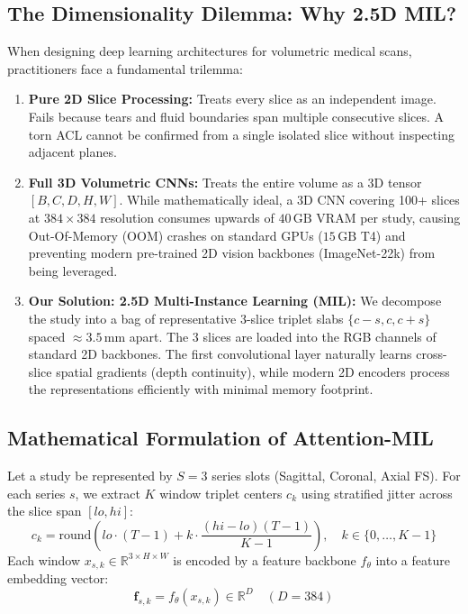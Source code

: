 \documentclass[11pt,a4paper]{article}
\begin{document}
\subsection{The Dimensionality Dilemma: Why 2.5D MIL?}
When designing deep learning architectures for volumetric medical scans, practitioners face a fundamental trilemma:
\begin{enumerate}
    \item \textbf{Pure 2D Slice Processing:} Treats every slice as an independent image. Fails because tears and fluid boundaries span multiple consecutive slices. A torn ACL cannot be confirmed from a single isolated slice without inspecting adjacent planes.
    \item \textbf{Full 3D Volumetric CNNs:} Treats the entire volume as a 3D tensor $[B, C, D, H, W]$. While mathematically ideal, a 3D CNN covering 100+ slices at $384\times 384$ resolution consumes upwards of $40\,\text{GB}$ VRAM per study, causing Out-Of-Memory (OOM) crashes on standard GPUs ($15\,\text{GB}$ T4) and preventing modern pre-trained 2D vision backbones (ImageNet-22k) from being leveraged.
    \item \textbf{Our Solution: 2.5D Multi-Instance Learning (MIL):} We decompose the study into a bag of representative 3-slice triplet slabs $\{c-s, c, c+s\}$ spaced $\approx 3.5\,\text{mm}$ apart. The 3 slices are loaded into the RGB channels of standard 2D backbones. The first convolutional layer naturally learns cross-slice spatial gradients (depth continuity), while modern 2D encoders process the representations efficiently with minimal memory footprint.
\end{enumerate}

\subsection{Mathematical Formulation of Attention-MIL}
Let a study be represented by $S = 3$ series slots (Sagittal, Coronal, Axial FS). For each series $s$, we extract $K$ window triplet centers $c_k$ using stratified jitter across the slice span $[lo, hi]$:
\begin{equation}
    c_k = \text{round}\left(lo \cdot (T-1) + k \cdot \frac{(hi - lo)(T-1)}{K-1}\right), \quad k \in \{0, \dots, K-1\}
\end{equation}
Each window $x_{s,k} \in \mathbb{R}^{3 \times H \times W}$ is encoded by a feature backbone $f_\theta$ into a feature embedding vector:
\begin{equation}
    \mathbf{f}_{s,k} = f_\theta(x_{s,k}) \in \mathbb{R}^D \quad (D = 384)
\end{equation}
\end{document}
